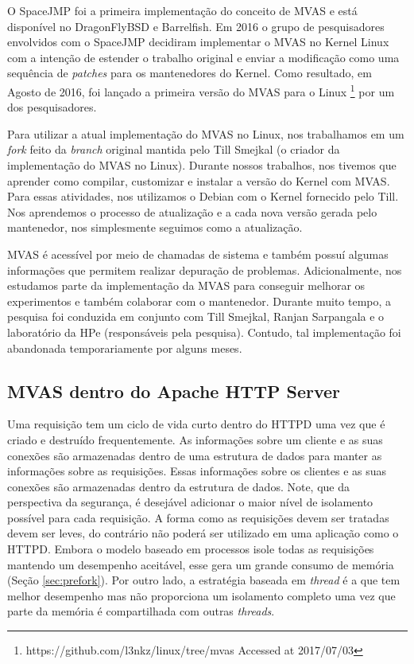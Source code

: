 O SpaceJMP \citep{spacejmp} foi a primeira implementação do conceito de MVAS e
está disponível no DragonFlyBSD e Barrelfish. Em 2016 o grupo de pesquisadores
envolvidos com o SpaceJMP decidiram implementar o MVAS no Kernel Linux com a
intenção de estender o trabalho original e enviar a modificação como uma
sequência de \emph{patches} para os mantenedores do Kernel. Como resultado, em
Agosto de 2016, foi lançado a primeira versão do MVAS para o Linux
\footnote{https://github.com/l3nkz/linux/tree/mvas Accessed at 2017/07/03} por
um dos pesquisadores.
 
Para utilizar a atual implementação do MVAS no Linux, nos trabalhamos em um
\emph{fork} feito da \emph{branch} original mantida pelo Till Smejkal (o
criador da implementação do MVAS no Linux). Durante nossos trabalhos, nos
tivemos que aprender como compilar, customizar e instalar a versão do Kernel
com MVAS. Para essas atividades, nos utilizamos o Debian com o Kernel fornecido
pelo Till. Nos aprendemos o processo de atualização e a cada nova versão gerada
pelo mantenedor, nos simplesmente seguimos como a atualização.

MVAS é acessível por meio de chamadas de sistema e também possuí algumas
informações que permitem realizar depuração de problemas. Adicionalmente, nos
estudamos parte da implementação da MVAS para conseguir melhorar os
experimentos e também colaborar com o mantenedor. Durante muito tempo, a
pesquisa foi conduzida em conjunto com Till Smejkal, Ranjan Sarpangala e o
laboratório da HPe (responsáveis pela pesquisa). Contudo, tal implementação foi
abandonada temporariamente por alguns meses.
 
\subsection{MVAS dentro do Apache HTTP Server}

Uma requisição tem um ciclo de vida curto dentro do HTTPD uma vez que é criado
e destruído frequentemente. As informações sobre um cliente e as suas conexões
são armazenadas dentro de uma estrutura de dados para manter as informações
sobre as requisições. Essas informações sobre os clientes e as suas conexões
são armazenadas dentro da estrutura de dados. Note, que da perspectiva da
segurança, é desejável adicionar o maior nível de isolamento possível para cada
requisição. A forma como as requisições devem ser tratadas devem ser leves, do
contrário não poderá ser utilizado em uma aplicação como o HTTPD. Embora o
modelo baseado em processos isole todas as requisições mantendo um desempenho
aceitável, esse gera um grande consumo de memória (Seção \ref{sec:prefork}).
Por outro lado, a estratégia baseada em \emph{thread} é a que tem melhor
desempenho mas não proporciona um isolamento completo uma vez que parte da
memória é compartilhada com outras \emph{threads}.

